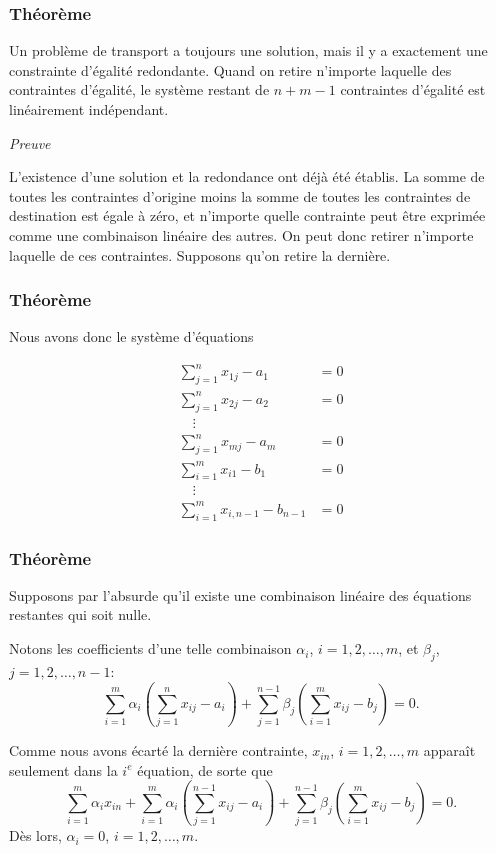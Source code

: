 \documentclass[usepdftitle=false]{beamer}
\begin{document}
\begin{frame}
\frametitle{Théorème}

Un problème de transport a toujours une solution, mais il y a exactement une constrainte d'égalité redondante.
Quand on retire n'importe laquelle des contraintes d'égalité, le système restant de $n+m-1$ contraintes d'égalité est linéairement indépendant.

\mbox{}

\emph{Preuve}

\mbox{}

L'existence d'une solution et la redondance ont déjà été établis.
La somme de toutes les contraintes d'origine moins la somme de toutes les contraintes de destination est égale à zéro, et n'importe quelle contrainte peut être exprimée comme une combinaison linéaire des autres. On peut donc retirer n'importe laquelle de ces contraintes. Supposons qu'on retire la dernière.

\end{frame}

\begin{frame}
\frametitle{Théorème}

Nous avons donc le système d'équations
\begin{footnotesize}
\begin{align*}
\sum_{j = 1}^n x_{1j} - a_1 & = 0  \\
\sum_{j = 1}^n x_{2j} - a_2 & = 0  \\
\quad \vdots & \\
\sum_{j = 1}^n x_{mj} - a_m & = 0  \\
\sum_{i = 1}^m x_{i1} - b_1 & = 0  \\
\quad \vdots & \\
\sum_{i = 1}^m x_{i,{n-1}} - b_{n-1} & = 0
\end{align*}
\end{footnotesize}

\end{frame}

\begin{frame}
\frametitle{Théorème}

Supposons par l'absurde qu'il existe une combinaison linéaire des équations restantes qui soit nulle.

Notons les coefficients d'une telle combinaison $\alpha_i$, $i = 1,2,\ldots,m$, et $\beta_j$, $j = 1,2,\ldots,n-1$:
\[
\sum_{i = 1}^m \alpha_i \left( \sum_{j = 1}^n x_{ij} - a_i \right) +
\sum_{j = 1}^{n-1} \beta_j \left( \sum_{i = 1}^m x_{ij} - b_j \right) = 0.
\]

\mbox{}

Comme nous avons écarté la dernière contrainte, $x_{in}$, $i = 1,2,\ldots,m$ apparaît seulement dans la $i^e$ équation, de sorte que
\[
\sum_{i = 1}^m \alpha_i x_{in} + \sum_{i = 1}^m \alpha_i \left( \sum_{j = 1}^{n-1} x_{ij} - a_i \right) +
\sum_{j = 1}^{n-1} \beta_j \left( \sum_{i = 1}^m x_{ij} - b_j \right) = 0.
\]
Dès lors, $\alpha_i = 0$, $i = 1, 2,\ldots,m$.

\end{frame}
\end{document}
